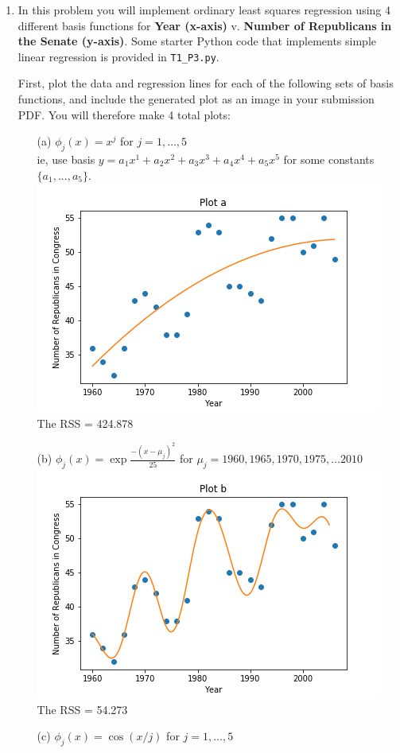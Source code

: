 \documentclass[submit]{harvardml}
\begin{document}
\begin{enumerate}

\item In this problem you will implement ordinary least squares regression using 4 different basis functions for
\textbf{Year (x-axis)} v. \textbf{Number of Republicans in the Senate (y-axis)}. Some starter Python code
that implements simple linear regression is provided in \verb|T1_P3.py|.

First, plot the data and regression lines for each of the following sets of basis functions, and include
the generated plot as an image in your submission PDF. You will therefore make 4 total plots:

\begin{enumerate}
	\item[(a)] $\phi_j(x) = x^j$ for $j=1, \ldots, 5$\\
    ie, use basis $y = a_1 x^1 + a_2 x^2 + a_3 x^3 + a_4 x^4 + a_5 x^5$ for some constants $\{a_1, ..., a_5\}$. \\
    \includegraphics[width=.5\textwidth]{Plot a.png}\\
    The RSS = 424.878\\
    \item[(b)] $\phi_j(x) = \exp{\frac{-(x-\mu_j)^2}{25}}$ for $\mu_j=1960, 1965, 1970, 1975, \ldots 2010$ \\
    \includegraphics[width=.5\textwidth]{Plot b.png}\\
    The RSS = 54.273\\
	\item[(c)] $\phi_j(x) = \cos(x / j)$ for $j=1, \ldots, 5$ \\

\end{enumerate}
\end{enumerate}
\end{document}

